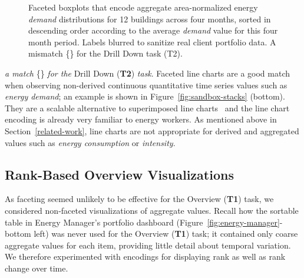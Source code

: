 \documentclass[journal]{vgtc}                %
\newcommand*\match{\textcolor{darkGreen}{\ding{52}}}
\newcommand*\mismatch{\textcolor{red}{\ding{54}}}
\newcommand{\bstart}[1]{\vspace{1mm} \noindent{\textbf{#1:}}}
\begin{document}
\begin{figure}[ht]
    \vspace{-0.3cm}
	\centering
	\vspace{-0.15cm}
	\caption{Faceted boxplots that encode aggregate area-normalized energy \textsl{demand} distributions for 12 buildings across four months, sorted in descending order according to the average \textsl{demand} value for this four month period. Labels blurred to sanitize real client portfolio data. A mismatch  \{\mismatch\} for the Drill Down task (T2).}
	\label{fig:sandbox-faceted-boxplot}
	\vspace{-0.3cm}
\end{figure} 

\bstart{Faceted line charts} {\it a match} \{\match\} {\it for the} Drill Down ({\bf T2}) {\it task}.
Faceted line charts are a good match when observing non-derived continuous quantitative time series values such as {\it energy demand}; an example is shown in Figure~\ref{fig:sandbox-stacks} (bottom).
They are a scalable alternative to superimposed line charts~\cite{Javed2010} and the line chart encoding is already very familiar to energy workers.
As mentioned above in Section~\ref{related-work}, line charts are not appropriate for derived and aggregated values such as {\it energy consumption} or {\it intensity}.


\subsection{Rank-Based Overview Visualizations}
\label{design-ranking}


As faceting seemed unlikely to be effective for the Overview ({\bf T1}) task, we considered non-faceted visualizations of aggregate values.
Recall how the sortable table in Energy Manager's portfolio dashboard (Figure~\ref{fig:energy-manager}-bottom left) was never used for the Overview ({\bf T1}) task; it contained only coarse aggregate values for each item, providing little detail about temporal variation.
We therefore experimented with encodings for displaying rank as well as rank change over time.
\end{document}
